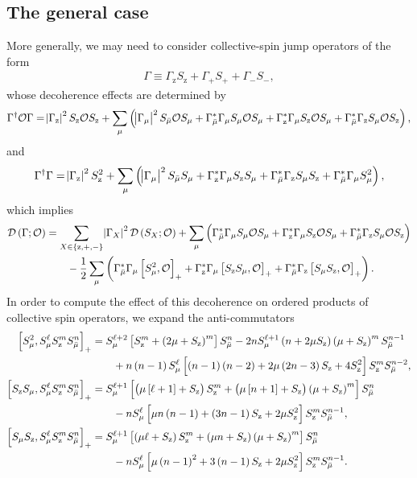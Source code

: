 \documentclass[aps,notitlepage,nofootinbib,11pt]{revtex4-1}
\newcommand{\f}[2]{\dfrac{#1}{#2}} %
\newcommand{\p}[1]{\left(#1\right)} %
\renewcommand{\sp}[1]{\left[#1\right]} %
\renewcommand{\set}[1]{\left\{#1\right\}} %
\newcommand{\D}{\mathcal{D}}
\renewcommand{\O}{\mathcal{O}}
\newcommand{\z}{\text{z}}
\newcommand{\bmu}{{\bar\mu}}
\newcommand{\1}{\mathds{1}}
\begin{document}
\subsection{The general case}
\label{sec:general_collective}

More generally, we may need to consider collective-spin jump operators
of the form
\begin{align}
  \Gamma \equiv \Gamma_\z S_\z + \Gamma_+ S_+ + \Gamma_- S_-,
\end{align}
whose decoherence effects are determined by
\begin{align}
  \Gamma^\dag \O \Gamma
  = \abs{\Gamma_\z}^2 S_\z \O S_\z
  + \sum_\mu \p{\abs{\Gamma_\mu}^2 S_\bmu \O S_\mu
    + \Gamma_\bmu^* \Gamma_\mu S_\mu \O S_\mu
    + \Gamma_\z^* \Gamma_\mu S_\z \O S_\mu
    + \Gamma_\bmu^* \Gamma_\z S_\mu \O S_\z},
\end{align}
and
\begin{align}
  \Gamma^\dag \Gamma
  = \abs{\Gamma_\z}^2 S_\z^2
  + \sum_\mu \p{\abs{\Gamma_\mu}^2 S_\bmu S_\mu
    + \Gamma_\z^*\Gamma_\mu S_\z S_\mu
    + \Gamma_\bmu^* \Gamma_\z S_\mu S_\z
    + \Gamma_\bmu^* \Gamma_\mu S_\mu^2},
\end{align}
which implies
\begin{align}
  \D\p{\Gamma;\O}
  &= \sum_{X\in\set{\z,+,-}} \abs{\Gamma_X}^2 \D\p{S_X;\O}
  + \sum_\mu \p{\Gamma_\bmu^* \Gamma_\mu S_\mu \O S_\mu
    + \Gamma_\z^* \Gamma_\mu S_\z \O S_\mu
    + \Gamma_\bmu^* \Gamma_\z S_\mu \O S_\z}
  \notag \\
  &\qquad -\f12 \sum_\mu\p{\Gamma_\bmu^* \Gamma_\mu \sp{S_\mu^2, \O}_+
    + \Gamma_\z^*\Gamma_\mu \sp{S_\z S_\mu, \O}_+
    + \Gamma_\bmu^* \Gamma_\z \sp{S_\mu S_\z, \O}_+}.
\end{align}
In order to compute the effect of this decoherence on ordered products
of collective spin operators, we expand the anti-commutators
\begin{align}
  \sp{S_\mu^2, S_\mu^\ell S_\z^m S_\bmu^n}_+
  &= S_\mu^{\ell+2} \sp{S_\z^m+\p{2\mu+S_\z}^m} S_\bmu^n
  - 2n S_\mu^{\ell+1} \p{n+2\mu S_\z} \p{\mu+S_\z}^m S_\bmu^{n-1}
  \notag \\
  &\qquad + n\p{n-1} S_\mu^\ell \sp{\p{n-1}\p{n-2}
    + 2\mu\p{2n-3} S_\z + 4 S_\z^2} S_\z^m S_\bmu^{n-2},
  \allowdisplaybreaks \\
  \sp{S_\z S_\mu, S_\mu^\ell S_\z^m S_\bmu^n}_+
  &= S_\mu^{\ell+1} \sp{\p{\mu\sp{\ell+1} + S_\z} S_\z^m
    + \p{\mu\sp{n+1} + S_\z} \p{\mu+S_\z}^m } S_\bmu^n \notag \\
  &\qquad - n S_\mu^\ell \sp{\mu n \p{n-1}
    + \p{3n-1} S_\z + 2\mu S_\z^2} S_\z^m S_\bmu^{n-1},
  \allowdisplaybreaks \\
  \sp{S_\mu S_\z, S_\mu^\ell S_\z^m S_\bmu^n}_+
  &= S_\mu^{\ell+1} \sp{\p{\mu\ell+S_\z} S_\z^m
    + \p{\mu n+S_\z} \p{\mu+S_\z}^m} S_\bmu^n \notag \\
  &\qquad - n S_\mu^\ell \sp{\mu\p{n-1}^2
    + 3\p{n-1} S_\z + 2\mu S_\z^2} S_\z^m S_\bmu^{n-1}.
\end{align}
\end{document}
